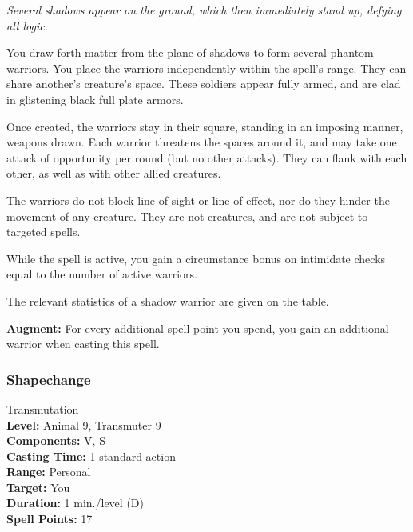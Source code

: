 \emph{Several shadows appear on the ground, which then immediately stand up, defying all logic.}

You draw forth matter from the plane of shadows to form several phantom warriors. 
You place the warriors independently within the spell's range.
They can share another's creature's space.
These soldiers appear fully armed, and are clad in glistening black full plate armors.

Once created, the warriors stay in their square, standing in an imposing manner, weapons drawn.
Each warrior threatens the spaces around it, and may take one attack of opportunity per round
(but no other attacks). They can flank with each other, as well as with other allied creatures.

The warriors do not block line of sight or line of effect, nor do they hinder the movement of
any creature. They are not creatures, and are not subject to targeted spells.

While the spell is active, you gain a circumstance bonus on intimidate checks equal to the number
of active warriors.

The relevant statistics of a shadow warrior are given on the  table.
\begin{table}
\label{tab:ShadowWarriors}
\caption{Shadow Warrior}
\end{table}

\textbf{Augment:} For every additional spell point you spend, you gain an additional warrior when casting this spell.
\subsubsection{Shapechange}
\label{Spell:Shapechange}
Transmutation
\\ \textbf{Level:} Animal 9, Transmuter 9
\\ \textbf{Components:} V, S
\\ \textbf{Casting Time:} 1 standard action
\\ \textbf{Range:} Personal
\\ \textbf{Target:} You
\\ \textbf{Duration:} 1 min./level (D)
\\ \textbf{Spell Points:} 17

